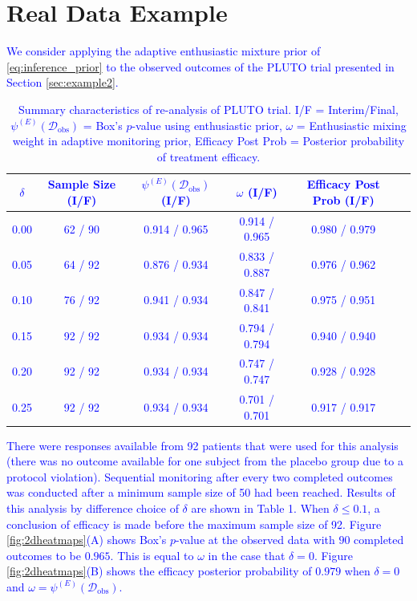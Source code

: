 \documentclass[AMA,STIX1COL,doublespace]{WileyNJD-v2}
\begin{document}
\section{Real Data Example}\label{sec:realdataexample}
\textcolor{blue}{
We consider applying the adaptive enthusiastic mixture prior of \eqref{eq:inference_prior} to the observed outcomes of the PLUTO trial presented in Section \ref{sec:example2}. %
\begin{center}
\begin{table}\label{tbl:real-pluto}%
\centering
\caption{Summary characteristics of re-analysis of PLUTO trial. I/F = Interim/Final, $\psi^{(E)}(\mathcal{D}_{\text{obs}})$ = Box's $p$-value using enthusiastic prior, $\omega$ = Enthusiastic mixing weight in adaptive monitoring prior, Efficacy Post Prob = Posterior probability of treatment efficacy.}%
\begin{tabular*}{400pt}{@{\extracolsep\fill}cccccc@{\extracolsep\fill}}%
\toprule
$\delta$	&	Sample Size (I/F)			&	$\psi^{(E)}(\mathcal{D}_{\text{obs}})$ (I/F)			&	$\omega$ (I/F)			&	Efficacy Post Prob (I/F)			\\
\midrule
0.00	&	62	/	90	&	0.914	/	0.965	&	0.914	/	0.965	&	0.980	/	0.979	\\
0.05	&	64	/	92	&	0.876	/	0.934	&	0.833	/	0.887	&	0.976	/	0.962	\\
0.10	&	76	/	92	&	0.941	/	0.934	&	0.847	/	0.841	&	0.975	/	0.951	\\
0.15	&	92	/	92	&	0.934	/	0.934	&	0.794	/	0.794	&	0.940	/	0.940	\\
0.20	&	92	/	92	&	0.934	/	0.934	&	0.747	/	0.747	&	0.928	/	0.928	\\
0.25	&	92	/	92	&	0.934	/	0.934	&	0.701	/	0.701	&	0.917	/	0.917	\\
\bottomrule
\end{tabular*}
\end{table}
\end{center}
There were responses available from 92 patients that were used for this analysis (there was no outcome available for one subject from the placebo group due to a protocol violation). Sequential monitoring after every two completed outcomes was conducted after a minimum sample size of 50 had been reached. Results of this analysis by difference choice of $\delta$ are shown in Table 1. When $\delta\leq 0.1$, a conclusion of efficacy is made before the maximum sample size of 92. Figure \ref{fig:2dheatmaps}(A) shows Box's $p$-value at the observed data with $90$ completed outcomes to be $0.965$. This is equal to $\omega$ in the case that $\delta=0$. Figure \ref{fig:2dheatmaps}(B) shows the efficacy posterior probability of $0.979$ when $\delta=0$ and $\omega=\psi^{(E)}(\mathcal{D}_{\text{obs}})$.
}
\end{document}
